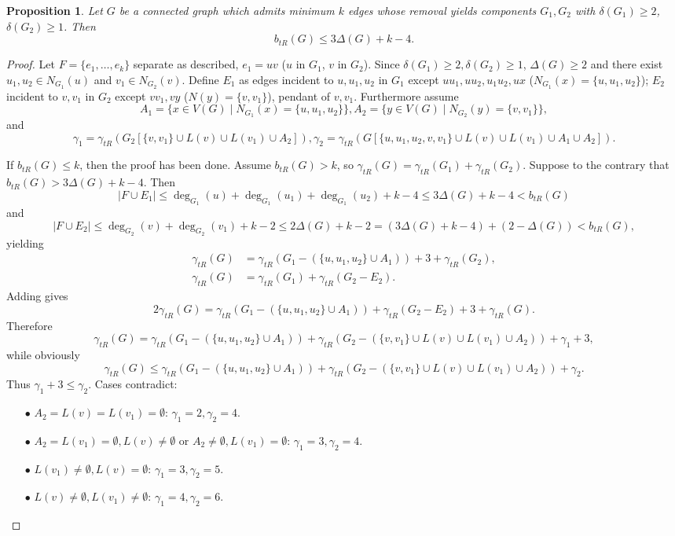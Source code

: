 \documentclass[12pt,reqno]{amsart}
\theoremstyle{plain}
\newtheorem{proposition}[theorem]{Proposition}
\numberwithin{equation}{section}
\begin{document}
\begin{proposition}
Let $G$ be a connected graph which admits minimum $k$ edges whose removal yields components $G_1, G_2$ with $\delta(G_1) \geq 2$, $\delta(G_2) \geq 1$. Then 
$$b_{tR}(G) \leq 3 \Delta(G)+k-4.$$
\end{proposition}
\begin{proof}
Let $F = \{e_1, \dots, e_k\}$ separate as described, $e_1 = uv$ ($u$ in $G_1$, $v$ in $G_2$). Since $\delta(G_1) \geq 2, \delta(G_2)\geq 1$, $\Delta (G)\geq 2$ and
there exist $u_1,u_2 \in N_{G_1}(u)$ and $v_1 \in N_{G_2}(v)$. Define $E_1$ as edges incident to $u,u_1,u_2$ in $G_1$ except $uu_1, uu_2, u_1u_2, ux$ ($N_{G_1}(x) = \{u,u_1,u_2\}$); $E_2$ incident to $v,v_1$ in $G_2$ except $vv_1, vy$ ($N(y) = \{v,v_1\}$), pendant of $v,v_1$.  Furthermore assume
$$A_1=\{x\in V(G) \mid N_{G_1}(x)=\{u,u_1, u_2\}\}, A_2=\{y \in V(G) \mid  N_{G_2}(y)=\{v,v_1\}\},$$
and
$$\gamma_1=\gamma_{tR}(G_2[\{v,v_1\}\cup L(v)\cup L(v_1)\cup A_2]), \gamma_2=\gamma_{tR}(G[\{u,u_1, u_2,v,v_1\}\cup L(v)\cup L(v_1)\cup A_1 \cup A_2]).$$

If $b_{tR}(G)\leq k$, then the proof has been done. Assume $b_{tR}(G)>k$, so
$\gamma_{tR}(G)=\gamma_{tR}(G_1)+\gamma_{tR}(G_2)$. Suppose to the contrary that $b_{tR}(G) > 3 \Delta(G)+k-4$. Then
$$|F \cup E_1| \leq \deg_{G_1} (u)+ \deg_{G_1} (u_1)+ \deg_{G_1} (u_2)+k-4 \leq 3 \Delta(G)+k-4< b_{tR}(G)$$
and
$$|F \cup E_2| \leq \deg_{G_2} (v)+ \deg_{G_2} (v_1)+k-2 \leq 2 \Delta(G)+k-2= (3\Delta (G) +k-4)+(2-\Delta(G)) < b_{tR}(G),$$
yielding
\begin{align*}
 \gamma_{tR}(G)&=\gamma_{tR}(G_1-(\{u,u_1,u_2\}\cup A_1))+3+\gamma_{tR}(G_2),\\
 \gamma_{tR}(G)&=\gamma_{tR}(G_1)+\gamma_{tR}(G_2-E_2).
\end{align*}
Adding gives
$$2\gamma_{tR}(G)=\gamma_{tR}(G_1-(\{u,u_1,u_2\}\cup A_1))+\gamma_{tR}(G_2-E_2)+3+\gamma_{tR}(G).$$
Therefore
$$\gamma_{tR}(G)=\gamma_{tR}(G_1-(\{u,u_1,u_2\}\cup A_1))+\gamma_{tR}(G_2-(\{v,v_1\}\cup L(v)\cup L(v_1)\cup A_2))+\gamma_1+3,$$
while obviously
$$\gamma_{tR}(G)\leq \gamma_{tR}(G_1-(\{u,u_1,u_2\}\cup A_1))+\gamma_{tR}(G_2-(\{v,v_1\}\cup L(v)\cup L(v_1)\cup A_2))+\gamma_2.$$
Thus $\gamma_1+3 \leq \gamma_2$. Cases contradict:
\begin{itemize}
  \item[$\bullet$] $A_2=L(v)=L(v_1)=\emptyset$: $\gamma_1=2 ,\gamma_2=4$.
  \item[$\bullet$] $A_2=L(v_1)=\emptyset, L(v)\neq \emptyset$ or $A_2\neq \emptyset, L(v_1)=\emptyset$: $\gamma_1=3 ,\gamma_2=4$.
  \item[$\bullet$] $L(v_1)\neq \emptyset, L(v)=\emptyset$: $\gamma_1=3 ,\gamma_2=5$.
  \item[$\bullet$] $L(v)\neq \emptyset, L(v_1)\neq \emptyset$: $\gamma_1=4 ,\gamma_2=6$.
\end{itemize}
\end{proof}
\end{document}
